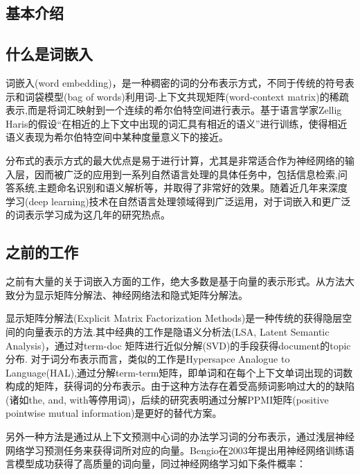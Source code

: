 \documentclass[a4paper,13pt]{article}
\begin{document}
%

\newpage
\begin{spacing}{1.5}\xiaosi 
\section{基本介绍}
\subsection{什么是词嵌入}
词嵌入(word embedding)，是一种稠密的词的分布表示方式，不同于传统的符号表示和词袋模型(bag of words)利用词-上下文共现矩阵(word-context matrix)的稀疏表示,而是将词汇映射到一个连续的希尔伯特空间进行表示。基于语言学家Zellig Haris的假设“在相近的上下文中出现的词汇具有相近的语义”\cite{harris1954distributional}进行训练，使得相近语义表现为希尔伯特空间中某种度量意义下的接近。

分布式的表示方式的最大优点是易于进行计算，尤其是非常适合作为神经网络的输入层，因而被广泛的应用到一系列自然语言处理的具体任务中，包括信息检索\cite{manning2008introduction},问答系统\cite{tellex2003quantitative},主题命名识别\cite{turian2010word}和语义解析\cite{socher2011parsing}等，并取得了非常好的效果。随着近几年来深度学习(deep learning)技术在自然语言处理领域得到广泛运用，对于词嵌入和更广泛的词表示学习成为这几年的研究热点。

\subsection{之前的工作}
之前有大量的关于词嵌入方面的工作，绝大多数是基于向量的表示形式。从方法大致分为显示矩阵分解法、神经网络法和隐式矩阵分解法。

显示矩阵分解法(Explicit Matrix Factorization Methods)是一种传统的获得隐层空间的向量表示的方法.其中经典的工作是隐语义分析法(LSA, Latent Semantic Analysis)，通过对term-doc 矩阵进行近似分解(SVD)的手段获得document的topic分布. 对于词分布表示而言，类似的工作是Hypersapce Analogue to Language(HAL)\cite{lund1996producing},通过分解term-term矩阵，即单词和在每个上下文单词出现的词数构成的矩阵，获得词的分布表示。由于这种方法存在着受高频词影响过大的的缺陷(诸如the, and, with等停用词)，后续的研究表明通过分解PPMI矩阵(positive pointwise mutual information)是更好的替代方案\cite{lebret2013word}。

另外一种方法是通过从上下文预测中心词的办法学习词的分布表示，通过浅层神经网络学习预测任务来获得词所对应的向量。Bengio在2003年提出用神经网络训练语言模型成功获得了高质量的词向量\cite{bengio2006neural}，同过神经网络学习如下条件概率：


\end{spacing}
\end{document}
